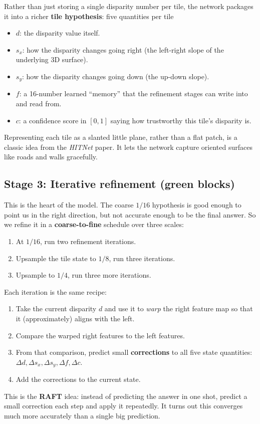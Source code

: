 \documentclass[11pt,a4paper]{article}
\begin{document}
Rather than just storing a single disparity number per tile, the network
packages it into a richer \textbf{tile hypothesis}: five quantities per
tile
\begin{itemize}[leftmargin=*, topsep=1pt, itemsep=0pt]
  \item $d$: the disparity value itself.
  \item $s_x$: how the disparity changes going right (the left-right
    slope of the underlying 3D surface).
  \item $s_y$: how the disparity changes going down (the up-down
    slope).
  \item $f$: a 16-number learned ``memory'' that the refinement stages
    can write into and read from.
  \item $c$: a confidence score in $[0, 1]$ saying how trustworthy this
    tile's disparity is.
\end{itemize}
Representing each tile as a slanted little plane, rather than a flat
patch, is a classic idea from the \textit{HITNet} paper. It lets the
network capture oriented surfaces like roads and walls gracefully.

\subsection{Stage 3: Iterative refinement (green blocks)}

This is the heart of the model. The coarse $1/16$ hypothesis is good
enough to point us in the right direction, but not accurate enough to be
the final answer. So we refine it in a \textbf{coarse-to-fine} schedule
over three scales:
\begin{enumerate}[leftmargin=*, topsep=1pt, itemsep=0pt]
  \item At $1/16$, run two refinement iterations.
  \item Upsample the tile state to $1/8$, run three iterations.
  \item Upsample to $1/4$, run three more iterations.
\end{enumerate}
Each iteration is the same recipe:
\begin{enumerate}[leftmargin=*, topsep=1pt, itemsep=0pt]
  \item Take the current disparity $d$ and use it to \emph{warp} the
    right feature map so that it (approximately) aligns with the left.
  \item Compare the warped right features to the left features.
  \item From that comparison, predict small \textbf{corrections} to all
    five state quantities: $\Delta d, \Delta s_x, \Delta s_y, \Delta f,
    \Delta c$.
  \item Add the corrections to the current state.
\end{enumerate}
This is the \textbf{RAFT} idea: instead of predicting the answer in one
shot, predict a small correction each step and apply it repeatedly. It
turns out this converges much more accurately than a single big
prediction.
\end{document}
